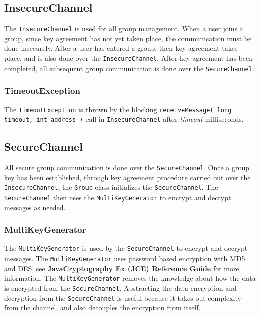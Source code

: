 \documentclass[12pt]{article}
\newcommand{\code}[1]{\texttt{#1}}
\begin{document}
      \subsection{InsecureChannel}
      \label{xref:insecurechannel}
	The \code{InsecureChannel} is used for all group management.  When
	a user joins a group, since key agreement has not yet taken place, 
	the communication must be done insecurely.   After a user has 
	entered a group, then key agreement takes place, and is also done 
	over the \code{InsecureChannel}.  After key agreement has been 
	completed, all subsequent group communication is done over the 
	\code{SecureChannel}.
	\subsubsection{TimeoutException}
	\label{xref:timeoutexception}
	  The \code{TimeoutException} is thrown by the blocking 
	  \code{receiveMessage( long timeout, int address )} 
	  call in \code{InsecureChannel} after \textit{timeout} 
	  milliseconds.


    \subsection{SecureChannel}
    \label{xref:securechannel}
      All secure group communication is done over the \code{SecureChannel}.
      Once a group key has been established, through key agreement procedure
      carried out over the \code{InsecureChannel}, the \code{Group} class 
      initializes the \code{SecureChannel}.  The \code{SecureChannel} then 
      uses the \code{MultiKeyGenerator} to encrypt and decrypt messages as 
      needed.
		    
      \subsubsection{MultiKeyGenerator}
      \label{xref:multikeygenerator}
	The \code{MultiKeyGenerator} is used by the \code{SecureChannel}
	to encrypt and decrypt messages.  The \code{MutliKeyGenerator}
	uses password based encryption with MD5 and DES, see 
	\textbf{Java\texttrademark Cryptography Ex (JCE) Reference Guide}
	for more information.  The \code{MultiKeyGenerator} removes the 
	knowledge about how the data is encrypted from the 
	\code{SecureChannel}. Abstracting the data encryption and decryption
	from the \code{SecureChannel} is useful because it takes out 
	complexity from the channel, and also decouples the encryption from
	itself.
\end{document}
